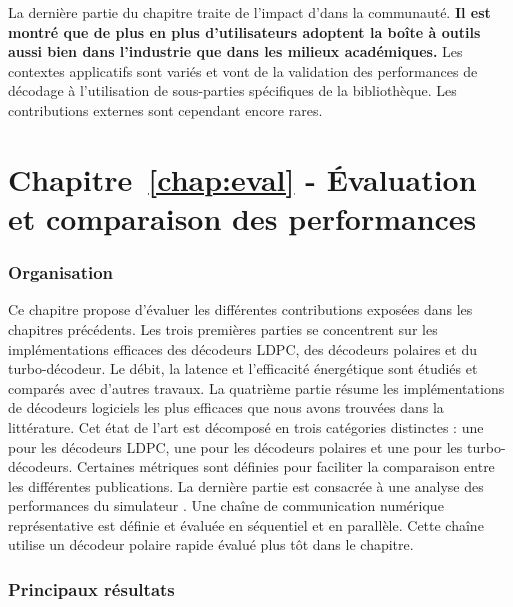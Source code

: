 La dernière partie du chapitre traite de l'impact d'\AFFECT dans la communauté.
\textbf{Il est montré que de plus en plus d'utilisateurs adoptent la boîte à
outils \AFFECT aussi bien dans l'industrie que dans les milieux académiques.}
Les contextes applicatifs sont variés et vont de la validation des performances
de décodage à l'utilisation de sous-parties spécifiques de la bibliothèque. Les
contributions externes sont cependant encore rares.

\section*{Chapitre~\ref{chap:eval} - Évaluation et comparaison des performances}

\subsubsection*{Organisation}

Ce chapitre propose d'évaluer les différentes contributions exposées dans les
chapitres précédents. Les trois premières parties se concentrent sur les
implémentations efficaces des décodeurs LDPC, des décodeurs polaires et du
turbo-décodeur. Le débit, la latence et l'efficacité énergétique sont étudiés
et comparés avec d'autres travaux. La quatrième partie résume les
implémentations de décodeurs logiciels les plus efficaces que nous avons
trouvées dans la littérature. Cet état de l'art est décomposé en trois
catégories distinctes : une pour les décodeurs LDPC, une pour les décodeurs
polaires et une pour les turbo-décodeurs. Certaines métriques sont définies pour
faciliter la comparaison entre les différentes publications. La dernière partie
est consacrée à une analyse des performances du simulateur \AFFECT. Une chaîne
de communication numérique représentative est définie et évaluée en séquentiel
et en parallèle. Cette chaîne utilise un décodeur polaire rapide évalué plus tôt
dans le chapitre.

\subsubsection*{Principaux résultats}

